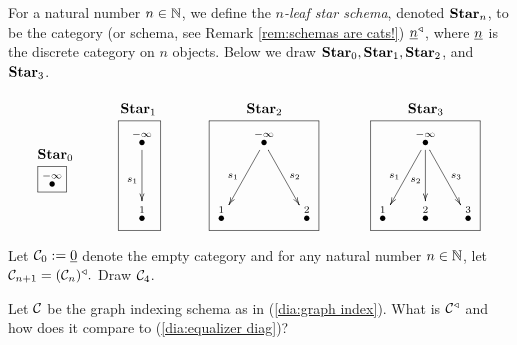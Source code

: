 \documentclass[CT4S-EN-RU]{subfiles}
\begin{document}
\begin{exampleENG}\label{ex:stars}
For a natural number $n\in{\mathbb N}$, we define the {\em $n$-leaf star schema}, denoted ${\mathbf{Star}}_n$, to be the category (or schema, see Remark \ref{rem:schemas are cats!}) $\underline{n}^\triangleleft$, where $\underline{n}$ is the discrete category on $n$ objects. Below we draw ${\mathbf{Star}}_0, {\mathbf{Star}}_1, {\mathbf{Star}}_2$, and ${\mathbf{Star}}_3$.
$$
\parbox{.3in}{\boxtitle{$\Star_0$}\fbox{$\LMO{-\infty}$}}
\hspace{.5in}
\parbox{.4in}{\boxtitle{$\Star_1$}\fbox{\xymatrix@=15pt{\LMO{-\infty}\ar[dd]_{s_1}\\\\\LMO{1}}}}
\hspace{.5in}
\parbox{1.1in}{\boxtitle{$\Star_2$}\fbox{\xymatrix@=15pt{&\LMO{-\infty}\ar[ddl]_{s_1}\ar[ddr]^{s_2}\\\\\LMO{1}&&\LMO{2}}}}
\hspace{.5in}
\parbox{1.1in}{\boxtitle{$\Star_3$}\fbox{\xymatrix@=15pt{&\LMO{-\infty}\ar[ddl]_{s_1}\ar[dd]_{s_2}\ar[ddr]^{s_3}\\\\\LMO{1}&\LMO{2}&\LMO{3}}}}
$$
\end{exampleENG}

\begin{exampleRUS}\label{ex:stars}
\end{exampleRUS}

\begin{exerciseENG}
Let $\mathcal{C}_0:=\underline{0}$ denote the empty category and for any natural number $n\in{\mathbb N}$, let $\mathcal{C}_{n+1}=(\mathcal{C}_n)^\triangleleft.$ Draw $\mathcal{C}_4$.  
\end{exerciseENG}

\begin{exerciseRUS}
\end{exerciseRUS}

\begin{exerciseENG}
Let $\mathcal{C}$ be the graph indexing schema as in (\ref{dia:graph index}). What is $\mathcal{C}^\triangleleft$ and how does it compare to (\ref{dia:equalizer diag})? 
\end{exerciseENG}

\begin{exerciseRUS}
\end{exerciseRUS}
\end{document}
